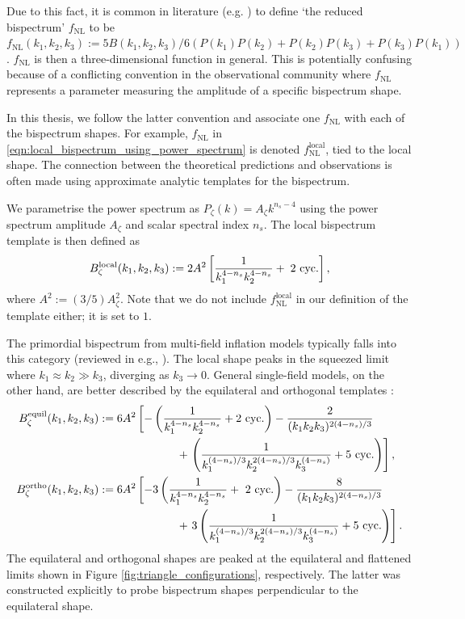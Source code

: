 Due to this fact, it is common in literature (e.g. \cite{Burrage2011large}) to define `the reduced bispectrum' $f_\text{NL}$ to be $f_\text{NL}(k_1,k_2,k_3) := 5B(k_1,k_2,k_3) / 6(P(k_1)P(k_2) + P(k_2)P(k_3) + P(k_3)P(k_1))$. $f_\text{NL}$ is then a three-dimensional function in general. This is potentially confusing because of a conflicting convention in the observational community where $f_\text{NL}$ represents a parameter measuring the amplitude of a specific bispectrum shape.

In this thesis, we follow the latter convention and associate one $f_\text{NL}$ with each of the bispectrum shapes. For example, $f_\text{NL}$ in \eqref{eqn:local_bispectrum_using_power_spectrum} is denoted $f_\text{NL}^\textrm{local}$, tied to the local shape. The connection between the theoretical predictions and observations is often made using approximate analytic templates for the bispectrum.

We parametrise the power spectrum as $P_\zeta(k) = A_\zeta k^{n_s-4}$ using the power spectrum amplitude $A_\zeta$ and scalar spectral index $n_s$. The local bispectrum template is then defined as 
\begin{align}
	B_\zeta^\textrm{local} (k_1, k_2, k_3) := 2A^2 \left[ \frac{1}{k_1^{4-n_s} k_2^{4-n_s}} + \text{\;2 cyc.} \right], \label{def:local_template} 
\end{align}
where $A^2 := (3/5) A_\zeta^2$. Note that we do not include $f_\text{NL}^\textrm{local}$ in our definition of the template either; it is set to $1$.

The primordial bispectrum from multi-field inflation models typically falls into this category (reviewed in e.g., \cite{Byrnes2010review}). The local shape peaks in the squeezed limit where ${k_1 \approx k_2 \gg k_3}$, diverging as $k_3\rightarrow0$. General single-field models, on the other hand, are better described by the equilateral and orthogonal templates \cite{Creminelli2006limits,Senatore2010orthogonal}:
\begin{align}
	B_\zeta^\textrm{equil} (k_1, k_2, k_3) &:= 6A^2 \left[ -\left( \frac{1}{k_1^{4-n_s} k_2^{4-n_s}} + \text{2 cyc.} \right) -\frac{2}{(k_1 k_2 k_3)^{2(4-n_s)/3}} \right.\nonumber\\
	&\hspace{0.2\textwidth} + \left. \left( \frac{1}{k_1^{(4-n_s)/3} k_2^{2(4-n_s)/3} k_3^{(4-n_s)}} + \text{5 cyc.} \right) \right], \label{def:equilateral_template} \\
	B_\zeta^\textrm{ortho} (k_1, k_2, k_3) &:= 6A^2 \left[ -3\left( \frac{1}{k_1^{4-n_s} k_2^{4-n_s}} + \text{ 2 cyc.} \right) -\frac{8}{(k_1 k_2 k_3)^{2(4-n_s)/3}} \right.\nonumber\\
	&\hspace{0.2\textwidth} + \left. 3\left( \frac{1}{k_1^{(4-n_s)/3} k_2^{2(4-n_s)/3} k_3^{(4-n_s)}} + \text{5 cyc.} \right) \right]. \label{def:orthogonal_template} 
\end{align}
The equilateral and orthogonal shapes are peaked at the equilateral and flattened limits shown in Figure \ref{fig:triangle_configurations}, respectively. The latter was constructed explicitly to probe bispectrum shapes perpendicular to the equilateral shape.

